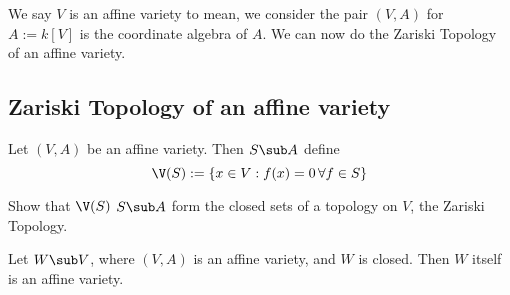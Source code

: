 We say $V$ is an affine variety to mean, we consider the pair $(V, A)$ for $A := k[V]$ is the coordinate algebra of $A$. We can now do the Zariski Topology of an affine variety.

\subsection{Zariski Topology of an affine variety}
Let $(V, A)$ be an affine variety. Then $S \sub A$ define
$$ \V(S) := \{x \in V : f(x) = 0 \,\forall f \in S\} $$
\begin{exercise}
  Show that $\V(S)$ $S \sub A$ form the closed sets of a topology on $V$, the Zariski Topology.
\end{exercise}

\begin{nprop}
  Let $W \sub V$, where $(V, A)$ is an affine variety, and $W$ is closed. Then $W$ itself is an affine variety.
\end{nprop}
